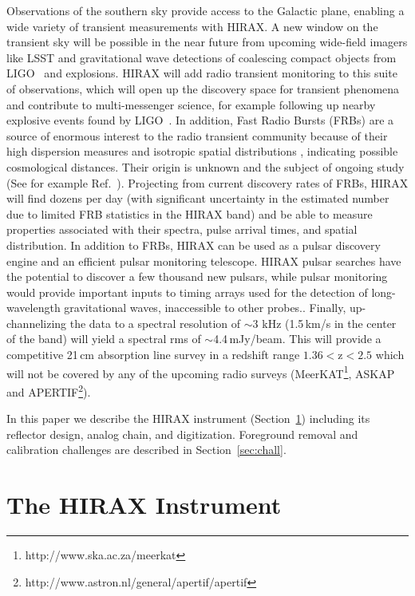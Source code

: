 \documentclass[]{spie}  %
\begin{document}
Observations of the southern sky provide access to the Galactic plane, enabling a wide variety of transient measurements with HIRAX. A new window on the transient sky will be possible in the near future from upcoming wide-field imagers like LSST and gravitational wave detections of coalescing compact objects from LIGO~\cite{PhysRevLett.116.241103} and explosions. HIRAX will add radio transient monitoring to this suite of observations, which will open up the discovery space for transient phenomena and contribute to multi-messenger science, for example following up nearby explosive events found by LIGO~\cite{2013MNRAS.430.2121P}. In addition, Fast Radio Bursts (FRBs) are a source of enormous interest to the radio transient community because of their high dispersion measures and isotropic spatial distributions \cite{2016MNRAS.460.1054C}, indicating possible cosmological distances. Their origin is unknown and the subject of ongoing study (See for example Ref.~\cite{2015Natur.528..523M}). Projecting from current discovery rates of FRBs, HIRAX will find dozens per day (with significant uncertainty in the estimated number due to limited FRB statistics in the HIRAX band) and be able to measure properties associated with their spectra, pulse arrival times, and spatial distribution. In addition to FRBs, HIRAX can be used as a pulsar discovery engine and an efficient pulsar monitoring telescope. HIRAX pulsar searches have the potential to discover a few thousand new pulsars, while pulsar monitoring would provide important inputs to timing arrays used for the detection of long-wavelength gravitational waves, inaccessible to other probes.\cite{2010CQGra..27h4013H}. Finally, up-channelizing the data to a spectral resolution of $\sim$3 kHz (1.5\,km/s in the center of the band) will yield a spectral rms of $\sim$4.4\,mJy/beam. This will provide a competitive 21\,cm absorption line survey in a redshift range $1.36<\mathrm{z}<2.5$ which will not be covered by any of the upcoming radio surveys (MeerKAT\footnote{http:\//\//www.ska.ac.za\//meerkat}, ASKAP\cite{2012SPIE.8444E..2AS} and APERTIF\footnote{http:\//\//www.astron.nl\//general\//apertif\//apertif}). \newline 

In this paper we describe the HIRAX instrument (Section~\ref{sec:instru}) including its reflector design, analog chain, and digitization. Foreground removal and calibration challenges  are described in Section~\ref{sec:chall}.


\section{The HIRAX Instrument}
\label{sec:instru}
\end{document}
